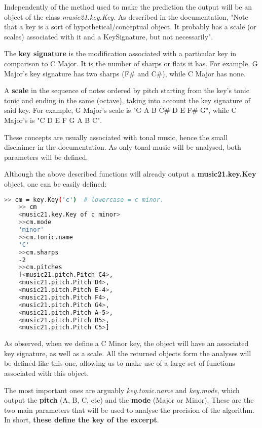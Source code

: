 Independently of the method used to make the prediction the output will be an object of the class \textit{music21.key.Key}.
As described in the documentation, "Note that a key is a sort of hypothetical/conceptual object.
It probably has a scale (or scales) associated with it and a KeySignature, but not necessarily".

The \textbf{key signature} is the modification associated with a particular key in comparison to C Major. It is the number of sharps or flats it has.
For example, G Major's key signature has two sharps (F\# and C\#), while C Major has none.

A \textbf{scale} in the sequence of notes ordered by pitch starting from the key's tonic tonic and ending in the same (octave), taking into account the key signature of said key.
For example, G Major's scale is "G A B C\# D E F\# G", while C Major's is "C D E F G A B C".

These concepts are usually associated with tonal music, hence the small disclaimer in the documentation.
As only tonal music will be analysed, both parameters will be defined.

Although the above described functions will already output a \textbf{music21.key.Key} object, one can be easily defined:
\pagebreak

\begin{lstlisting}[language=bash]
    >> cm = key.Key('c')  # lowercase = c minor.
    >> cm
    <music21.key.Key of c minor>
    >>cm.mode
    'minor'
    >>cm.tonic.name
    'C'
    >>cm.sharps
    -2
    >>cm.pitches
    [<music21.pitch.Pitch C4>,
    <music21.pitch.Pitch D4>,
    <music21.pitch.Pitch E-4>,
    <music21.pitch.Pitch F4>,
    <music21.pitch.Pitch G4>,
    <music21.pitch.Pitch A-5>,
    <music21.pitch.Pitch B5>,
    <music21.pitch.Pitch C5>]
\end{lstlisting}

As observed, when we define a C Minor key, the object will have an associated key signature, as well as a scale.
All the returned objects form the analyses will be defined like this one, allowing us to make use of a large set of functions associated with this object.

The most important ones are arguably \textit{key.tonic.name} and \textit{key.mode}, which output the \textbf{pitch} (A, B, C, etc) and the \textbf{mode} (Major or Minor).
These are the two main parameters that will be used to analyse the precision of the algorithm. In short, \textbf{these define the key of the excerpt}.

